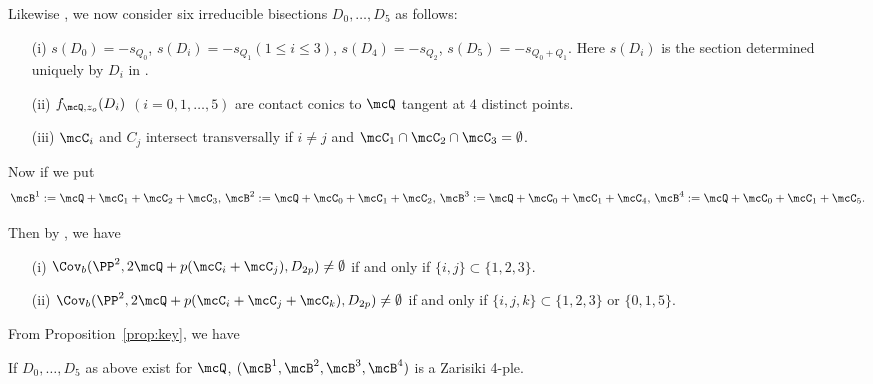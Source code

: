 Likewise \cite[p. 234]{bannai-tokunaga}, we now consider  six irreducible bisections  $D_0, \ldots, D_5$ as
follows:
\begin{enumerate}      
\item[(i)] $s(D_0) = -s_{Q_0}$,  $s(D_i) = - s_{Q_1} (1 \le i \le 3)$, $s(D_4) = - s_{Q_2}$, 
$s(D_5) = -s_{Q_0 + Q_1}$. Here $s(D_i)$ is the section determined uniquely by $D_i$ in \cite[Lemma~5.1]{shioda90}. 
\item[(ii)] $f_{\mcQ, z_o}(D_i)$ $(i = 0, 1,\ldots, 5)$  are contact conics to $\mcQ$ tangent at
$4$ distinct points.

\item[(iii)]  $\mcC_i$ and $C_j$ intersect transversally if $i \neq j$ and $\mcC_1\cap \mcC_2 \cap \mcC_3 = \emptyset$.
\end{enumerate}

Now if we put
\[
\mcB^1  :=  \mcQ + \mcC_1 + \mcC_2 + \mcC_3,  \,\mcB^2  :=   \mcQ + \mcC_0 + \mcC_1 + \mcC_2,\, 
\mcB^3  :=  \mcQ + \mcC_0 + \mcC_1 + \mcC_4, \, \mcB^4  :=   \mcQ + \mcC_0 + \mcC_1 + \mcC_5.
\]

Then by \cite[Theorem~4, Corollary~3, Corollary~4]{bannai-tokunaga}, we have

\begin{prop}\label{prop:key}{
\begin{enumerate}
\item[(i)] $\Cov_b(\PP^2, 2\mcQ + p(\mcC_i + \mcC_j), D_{2p}) \neq \emptyset$ if and only if $\{i, j\} \subset \{1, 2, 3\}$.
\item[(ii)]  $\Cov_b(\PP^2, 2\mcQ + p(\mcC_i + \mcC_j +\mcC_k), D_{2p}) \neq \emptyset$ if and only if $\{i, j, k\} \subset \{1, 2, 3\}$ or $\{0, 1, 5\}$.
\end{enumerate}
}
\end{prop}


From Proposition~\ref{prop:key},  we have

\begin{prop}\label{prop:z-4plet}{If $D_0, \ldots, D_5$ as above exist for 
$\mcQ$, $(\mcB^1, \mcB^2, \mcB^3, \mcB^4)$  is a Zarisiki 4-ple.
}
\end{prop}

